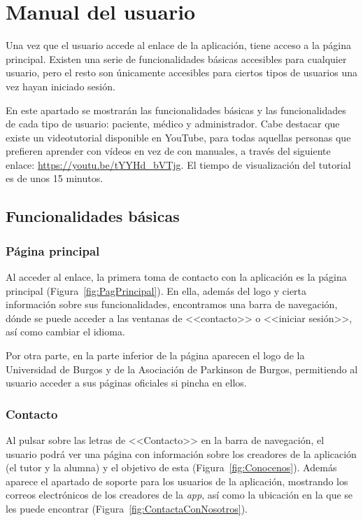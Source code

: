 \section{Manual del usuario}
Una vez que el usuario accede al enlace de la aplicación, tiene acceso a la página principal. Existen una serie de funcionalidades básicas accesibles para cualquier usuario, pero el resto son únicamente accesibles para ciertos tipos de usuarios una vez hayan iniciado sesión. 

En este apartado se mostrarán las funcionalidades básicas y las funcionalidades de cada tipo de usuario: paciente, médico y administrador.
Cabe destacar que existe un videotutorial disponible en YouTube, para todas aquellas personas que prefieren aprender con vídeos en vez de con manuales, a través del siguiente enlace: \url{https://youtu.be/tYYHd_bVTjg}. El tiempo de visualización del tutorial es de unos 15 minutos.

\subsection{Funcionalidades básicas}
    \subsubsection{Página principal}
    Al acceder al enlace, la primera toma de contacto con la aplicación es la página principal (Figura~\ref{fig:PagPrincipal}). En ella, además del logo y cierta información sobre sus funcionalidades, encontramos una barra de navegación, dónde se puede acceder a las ventanas de <<contacto>> o <<iniciar sesión>>, así como cambiar el idioma.
    
    Por otra parte, en la parte inferior de la página aparecen el logo de la Universidad de Burgos y de la Asociación de Parkinson de Burgos, permitiendo al usuario acceder a sus páginas oficiales si pincha en ellos. 

    
    \subsubsection{Contacto}
    Al pulsar sobre las letras de <<Contacto>> en la barra de navegación, el usuario podrá ver una página con información sobre los creadores de la aplicación (el tutor y la alumna) y el objetivo de esta (Figura~\ref{fig:Conocenos}). Además aparece el apartado de soporte para los usuarios de la aplicación, mostrando los correos electrónicos de los creadores de la \textit{app}, así como la ubicación en la que se les puede encontrar (Figura~\ref{fig:ContactaConNosotros}).

